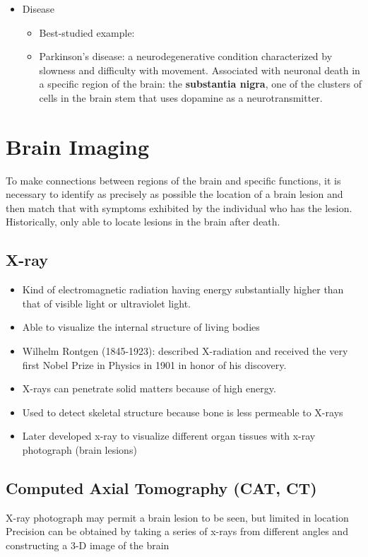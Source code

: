 \documentclass{article}
\begin{document}
\begin{itemize}
    \newpage 
    \item Disease
    \begin{itemize}
        \item Best-studied example: 
        \item Parkinson's disease: a neurodegenerative condition characterized by slowness and difficulty with movement.
        \subitem Associated with neuronal death in a specific region of the brain: the \textbf{substantia nigra}, one of the clusters of cells in the brain stem that uses dopamine as a neurotransmitter. 
    \end{itemize}
\end{itemize}

\section{Brain Imaging}
To make connections between regions of the brain and specific functions, it is necessary to identify as precisely as possible the location of a brain lesion and then match that with symptoms exhibited by the individual who has the lesion. \\
Historically, only able to locate lesions in the brain after death. 

\subsection{X-ray}
\begin{itemize}
    \item Kind of electromagnetic radiation having energy substantially higher than that of visible light or ultraviolet light. 
    \item Able to visualize the internal structure of living bodies
    \item Wilhelm Rontgen (1845-1923): described X-radiation and received the very first Nobel Prize in Physics in 1901 in honor of his discovery. 
    \item X-rays can penetrate solid matters because of high energy. 
    \item Used to detect skeletal structure because bone is less permeable to X-rays
    \item Later developed x-ray to visualize different organ tissues with x-ray photograph (brain lesions)
\end{itemize}

\subsection{Computed Axial Tomography (CAT, CT)}
X-ray photograph may permit a brain lesion to be seen, but limited in location \\ 
Precision can be obtained by taking a series of x-rays from different angles and constructing a 3-D image of the brain\\
\end{document}
